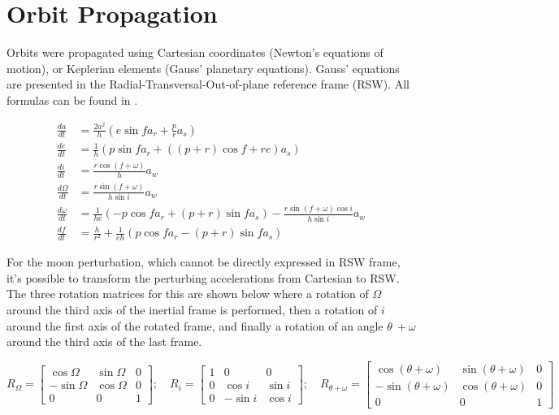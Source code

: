 \section{Orbit Propagation}
\label{sec:orbit_propagation}

Orbits were propagated using Cartesian coordinates (Newton’s equations of motion), or Keplerian elements (Gauss’ planetary equations). Gauss' equations are presented in the Radial-Transversal-Out-of-plane reference frame (RSW). All formulas can be found in \cite{curtis_book}.

\begin{equation}
	\begin{aligned}
		\frac{da}{dt} &= \frac{2a^2}{h} \left( e\sin f a_r + \frac{p}{r} a_s \right) \\
		\frac{de}{dt} &= \frac{1}{h} \left( p\sin f a_r + \left( (p + r) \cos f + re \right) a_s \right) \\
		\frac{di}{dt} &= \frac{r\cos (f + \omega)}{h} a_w \\
		\frac{d\Omega}{dt} &= \frac{r\sin (f + \omega)}{h\sin i} a_w \\
		\frac{d\omega}{dt} &= \frac{1}{he} \left( -p\cos f a_r + (p + r)\sin f a_s \right) - \frac{r\sin(f + \omega) \cos i}{h\sin i} a_w \\
		\frac{df}{dt} &= \frac{h}{r^2} + \frac{1}{eh} \left( p\cos f a_r - (p + r)\sin f a_s \right)
	\end{aligned}
\end{equation}
\vspace*{3pt}

For the moon perturbation, which cannot be directly expressed in RSW frame, it's possible to transform the perturbing accelerations from Cartesian to RSW. The three rotation matrices for this are shown below where a rotation of \(\Omega\) around the third axis of the inertial frame is performed, then a rotation of \(i\) around the first axis of the rotated frame, and finally a rotation of an angle \(\theta\ + \omega\) around the third axis of the last frame.

\begin{equation}
	R_{\Omega} = \begin{bmatrix}
		\cos \Omega & \sin \Omega & 0 \\
		-\sin \Omega & \cos \Omega & 0 \\
		0 & 0 & 1
	\end{bmatrix}; \quad
	R_{i} = \begin{bmatrix}
		1 & 0 & 0 \\
		0 & \cos i & \sin i \\
		0 & -\sin i & \cos i
	\end{bmatrix}; \quad
	R_{\theta + \omega} = \begin{bmatrix}
		\cos (\theta + \omega) & \sin (\theta + \omega) & 0 \\
		-\sin (\theta + \omega) & \cos (\theta + \omega) & 0 \\
		0 & 0 & 1
	\end{bmatrix}
\end{equation}


